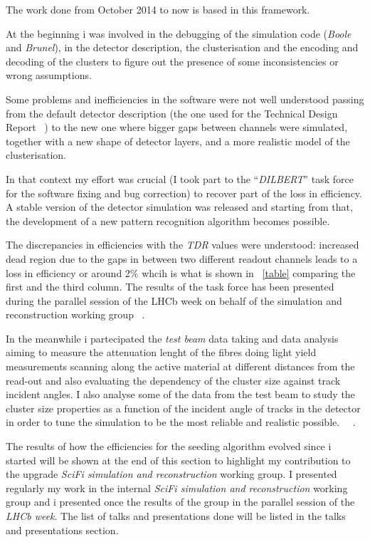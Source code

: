 \documentclass[paper=a4, fontsize=10pt]{scrartcl}
\numberwithin{equation}{section}		%
\numberwithin{figure}{section}			%
\numberwithin{table}{section}				%
\begin{document}
The work done from October 2014 to now is based in this framework. 

At the beginning i was involved in the debugging of the simulation code (\textit{Boole} and \textit{Brunel}), in the detector description, the clusterisation and the encoding and decoding of the clusters to figure out the presence of some inconsistencies or wrong assumptions.

Some problems and inefficiencies in the software were not well understood passing from the default detector description (the one used for the Technical Design Report ~\cite{SciFiTDR}) to the new one where bigger gaps between channels were simulated, together with a new shape of detector layers, and a more realistic model of the clusterisation. 

In that context my effort was crucial (I took part to the ``\textit{DILBERT}'' task force for the software fixing and bug correction) to recover part of the loss in efficiency. A stable version of the detector simulation was released and starting from that, the development of a new pattern recognition algorithm becomes possible. 

The discrepancies in efficiencies with the \textit{TDR} values were understood: increased dead region due to the gaps in between two different readout channels leads to a loss in efficiency or around 2$\%$ whcih is what is shown in ~\ref{table} comparing the first and the third column. The results of the task force has been presented during the parallel session of the LHCb week on behalf of the simulation and reconstruction working group ~\cite{LHCbWeek}.

In the meanwhile i partecipated the \textit{test beam} data taking and data analysis aiming to measure the attenuation lenght of the fibres doing light yield measurements scanning along the active material at different distances from the read-out and also evaluating the dependency of the cluster size against track incident angles. I also analyse some of the data from the test beam to study the cluster size properties as a function of the incident angle of tracks in the detector in order to tune the simulation to be the most reliable and realistic possible. ~\cite{AnalysisOrsay}~\cite{OrsayTestBeam}.




The results of how the efficiencies for the seeding algorithm evolved since i started will be shown at the end of this section to highlight my contribution to the upgrade \textit{SciFi simulation and reconstruction} working group. I presented regularly my work in the internal \textit{SciFi simulation and reconstruction} working group and i presented once the results of the group in the parallel session of the \textit{LHCb week}. The list of talks and presentations done will be listed in the talks and presentations section. 
\end{document}
